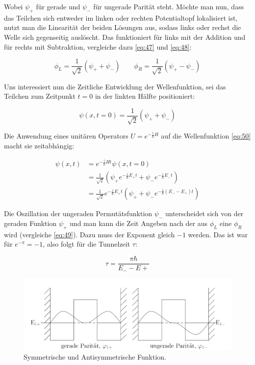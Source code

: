 Wobei \(\psi_+\) für gerade und \(\psi_-\) für ungerade Parität steht. Möchte man nun, dass das Teilchen sich entweder im linken oder rechten Potentialtopf lokalisiert ist, nutzt man die Linearität der beiden Lösungen aus, sodass links oder rechst die Welle sich gegenseitig auslöscht. Das funktioniert für links mit der Addition und für rechts mit Subtraktion, vergleiche dazu \eqref{eq:47} und \eqref{eq:48}:

\begin{equation}
  \label{eq:49}
  \phi_L = \frac{1}{\sqrt{2}}(\psi_+ + \psi_-) \qquad  \phi_R = \frac{1}{\sqrt{2}}(\psi_+ - \psi_-) 
\end{equation}

Uns interessiert nun die Zeitliche Entwicklung der Wellenfunktion, sei das Teilchen zum Zeitpunkt \(t=0\) in der linkten Hälfte positioniert:

\begin{equation}
  \label{eq:50}
  \psi(x,t=0) = \frac{1}{\sqrt{2}}(\psi_+ + \psi_-)
\end{equation}

Die Anwendung eines unitären Operators \(U=e^{-\frac{i}{\hbar}H}\) auf die Wellenfunktion \eqref{eq:50} macht sie zeitabhängig:

\begin{align}
  \label{eq:51}
  \psi(x,t) &= e^{-\frac{i}{\hbar}Ht}\psi(x,t=0)\\
&= \frac{1}{\sqrt{2}}\left(\psi_+e^{-\frac{i}{\hbar}E_+t} + \psi_-e^{-\frac{i}{\hbar}E_-t}\right) \\
&= \frac{1}{\sqrt{2}}e^{-\frac{i}{\hbar}E_+t}\left(\psi_+ + \psi_-e^{-\frac{i}{\hbar}(E_--E_+)t}\right) 
\end{align}

Die Oszillation der ungeraden Permutätsfunktion \(\psi_-\) unterscheidet sich von der geraden Funktion \(\psi_+\) und man kann die Zeit Angeben nach der aus \(\phi_L\) eine \(\phi_R\) wird (vergleiche \eqref{eq:49}). Dazu muss der Exponent gleich \(-1\) werden. Das ist war für \(e^{-\pi} = -1\), also folgt für die Tunnelzeit \(\tau\):

\begin{equation}
  \label{eq:52}
  \tau = \frac{\pi\hbar}{E_--E+}
\end{equation}


\begin{figure}[htbp]
  \centering
  \includegraphics{./sgl_doppelmuldenpotential_pics/pic02_v.pdf}
  \caption{Symmetrische und Antisymmetrische Funktion.}
  \label{fig:fg2}
\end{figure}


